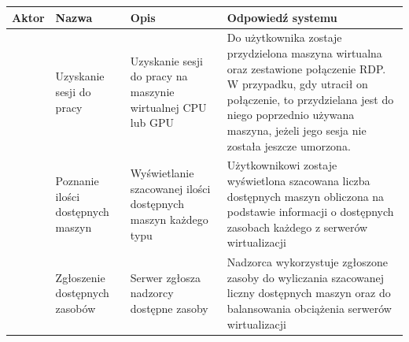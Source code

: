 \documentclass[12pt]{article}
\begin{document}
\begin{center}
	\begin{table}[h!]
		\begin{tabular}{|p{}|p{}|p{}|p{}|}
			\hline Aktor                                                                    & Nazwa                             & Opis                                                          & Odpowiedź systemu                                                                                                                                             \\ \hline
			\multirow{10}{=}{\rotatebox{90}{Użytkownik}}                                    & Uzyskanie sesji do pracy          & Uzyskanie sesji do pracy na maszynie wirtualnej CPU lub GPU   & Do użytkownika zostaje przydzielona maszyna wirtualna oraz zestawione połączenie RDP. W przypadku, gdy utracił on połączenie, to przydzielana jest do niego poprzednio używana maszyna, jeżeli jego sesja nie została jeszcze umorzona.                                                                     \\ \cline{2-4}
			                                                                                & Poznanie ilości dostępnych maszyn & Wyświetlanie szacowanej ilości dostępnych maszyn każdego typu & Użytkownikowi zostaje wyświetlona szacowana liczba dostępnych maszyn obliczona na podstawie informacji o dostępnych zasobach każdego z serwerów wirtualizacji \\ \hline
			\multirow[b]{5}{=}{\rotatebox{90}{\parbox{1cm}{Serwer \newline wirtualizacji}}} & Zgłoszenie dostępnych zasobów     & Serwer zgłosza nadzorcy dostępne zasoby                       & Nadzorca wykorzystuje zgłoszone zasoby do wyliczania szacowanej liczny dostępnych maszyn oraz do balansowania obciążenia serwerów wirtualizacji               \\
			\hline
		\end{tabular}
	\end{table}
\end{center}

\newpage
\end{document}

